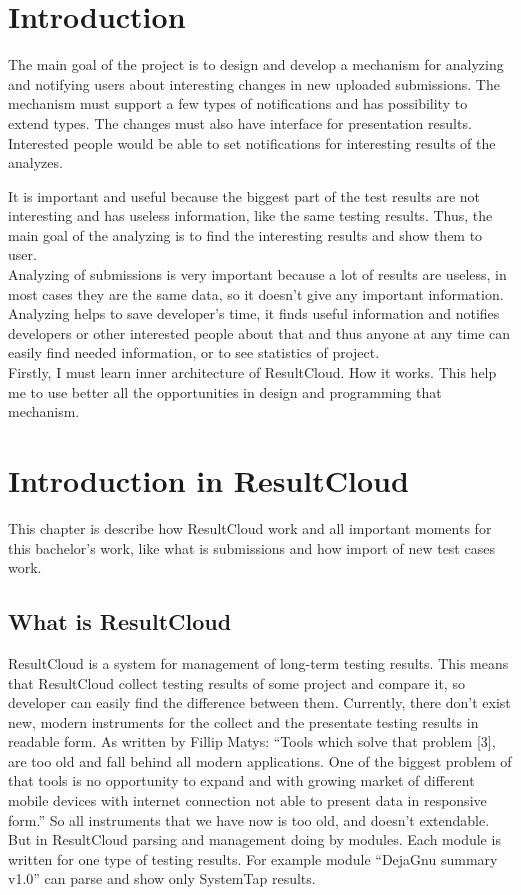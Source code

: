 
\chapter{Introduction}

The main goal of the project is to design and develop a mechanism for analyzing and notifying users about interesting changes in new uploaded submissions. The mechanism must support a few types of notifications and has possibility to extend types. The changes must also have interface for presentation results. Interested people would be able to set notifications for interesting results of the analyzes.

It is important and useful because the biggest part of the test results are not interesting and has useless information, like the same testing results. Thus, the main goal of the analyzing is to find the interesting results and show them to user.\\Analyzing of submissions is very important because a lot of results are useless, in most cases they are the same data, so it doesn't give any important information. Analyzing helps to save developer's time, it finds useful information and notifies developers or other interested people about that and thus anyone at any time can easily find needed information, or to see statistics of project.\\Firstly, I must learn inner architecture of ResultCloud. How it works. This help me to use better all the opportunities in design and programming that mechanism.

\chapter{Introduction in ResultCloud}

This chapter is describe how ResultCloud work and all important moments for this bachelor's work, like what is submissions and how import of new test cases work.

\section{What is ResultCloud}

ResultCloud is a system for management of long-term testing results. This means that ResultCloud collect testing results of some project and compare it, so developer can easily find the difference between them. Currently, there don't exist new, modern instruments for the collect and the presentate testing results in readable form. As written by Fillip Matys: “Tools which solve that problem [3], are too old and fall behind all modern applications. One of the biggest problem of that tools is no opportunity to expand and with growing market of different mobile devices with internet connection not able to present data in responsive form.” So all instruments that we have now is too old, and doesn't extendable. But in ResultCloud parsing and management doing by modules. Each module is written for one type of testing results. For example module “DejaGnu summary v1.0” can parse and show only SystemTap results. 

